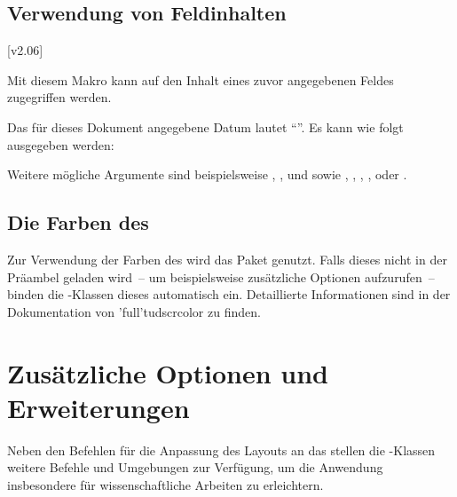 \begin{DeclareEntity*}{}
\begin{DeclareEntity*}{}
\begin{DeclareEntity*}{}
\subsection{%
  Verwendung von Feldinhalten%
}

\begin{Declaration}
  {}
  [v2.06]
\printdeclarationlist

Mit diesem Makro kann auf den Inhalt eines zuvor angegebenen Feldes zugegriffen 
werden.
\begin{Example}
Das für dieses Dokument angegebene Datum lautet \enquote{}. Es 
kann wie folgt ausgegeben werden:
\begin{Code}
\end{Code}
\end{Example}
Weitere mögliche Argumente sind beispielsweise , 
,  und  sowie ,
, , ,  oder
.
\end{Declaration}



\subsection{Die Farben des \CDs}

Zur Verwendung der Farben des \CDs wird das Paket  
genutzt. Falls dieses nicht in der Präambel geladen wird~-- um beispielsweise 
zusätzliche Optionen aufzurufen~-- binden die \TUDScript-Klassen dieses 
automatisch ein. Detaillierte Informationen sind in der Dokumentation von 
\Package'full'{tudscrcolor} zu finden.%
%



\section{Zusätzliche Optionen und Erweiterungen}

%
Neben den Befehlen für die Anpassung des Layouts an das \TUDCD stellen die 
\TUDScript-Klassen weitere Befehle und Umgebungen zur Verfügung, um die 
Anwendung insbesondere für wissenschaftliche Arbeiten zu erleichtern.




\end{DeclareEntity*}
\end{DeclareEntity*}
\end{DeclareEntity*}
